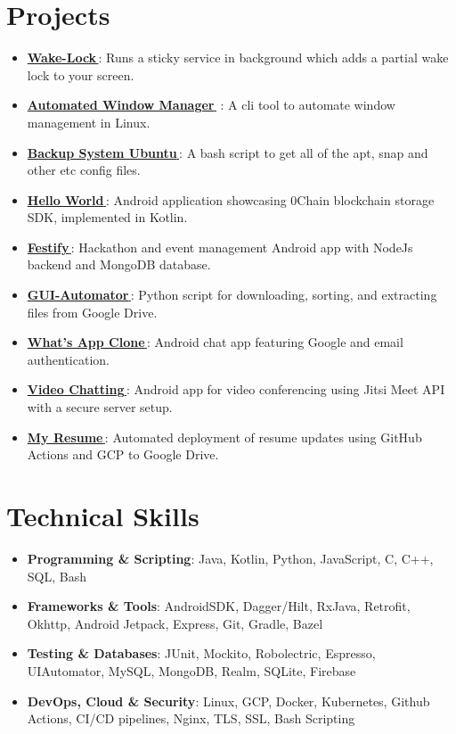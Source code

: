 \documentclass[letterpaper,1pt]{article}
\let\orighref\href
\renewcommand{\href}[2]{\orighref{#1}{#2\,\faExternalLink}}
\begin{document}
\section{Projects}
\begin{itemize}[leftmargin=*, itemsep=1pt, parsep=0pt]
  \item \href{https://github.com/yash10019coder/Wake-Lock}{\textbf{Wake-Lock}}: Runs a sticky service in background which adds a partial wake lock to your screen.
  \item \href{https://github.com/yash10019coder/AutomatedWindowManager}{\textbf{Automated Window Manager}} : A cli tool to automate window management in Linux.
  \item \href{https://github.com/yash10019coder/backup-system-ubuntu}{\textbf{Backup System Ubuntu}}: A bash script to get all of the apt, snap and other etc config files.
  \item \href{https://github.com/0chain/HelloWorld-Android}{\textbf{Hello World}}: Android application showcasing 0Chain blockchain storage SDK, implemented in Kotlin.
  \item \href{https://github.com/yash10019coder/festify-android}{\textbf{Festify}}: Hackathon and event management Android app with NodeJs backend and MongoDB database.
  \item \href{https://github.com/yash10019coder/Gui-Automator}{\textbf{GUI-Automator}}: Python script for downloading, sorting, and extracting files from Google Drive.
  \item \href{https://github.com/yash10019coder/Whats-App}{\textbf{What's App Clone}}: Android chat app featuring Google and email authentication.
  \item \href{https://github.com/yash10019coder/Video-Chatting}{\textbf{Video Chatting}}: Android app for video conferencing using Jitsi Meet API with a secure server setup.
  \item \href{https://github.com/yash10019coder/resume}{\textbf{My Resume}}: Automated deployment of resume updates using GitHub Actions and GCP to Google Drive.
\end{itemize}

%
\section{Technical Skills}
\begin{itemize}
  \setlength\itemsep{0em}
  \setlength\parsep{0em}
  \item \textbf{Programming \& Scripting}: Java, Kotlin, Python, JavaScript, C, C++, SQL, Bash
  \item \textbf{Frameworks \& Tools}: AndroidSDK, Dagger/Hilt, RxJava, Retrofit, Okhttp, Android Jetpack, Express, Git, Gradle, Bazel
  \item \textbf{Testing \& Databases}: JUnit, Mockito, Robolectric, Espresso, UIAutomator, MySQL, MongoDB, Realm, SQLite, Firebase
  \item \textbf{DevOps, Cloud \& Security}: Linux, GCP, Docker, Kubernetes, Github Actions, CI/CD pipelines, Nginx, TLS, SSL, Bash Scripting
\end{itemize}


\end{document}
